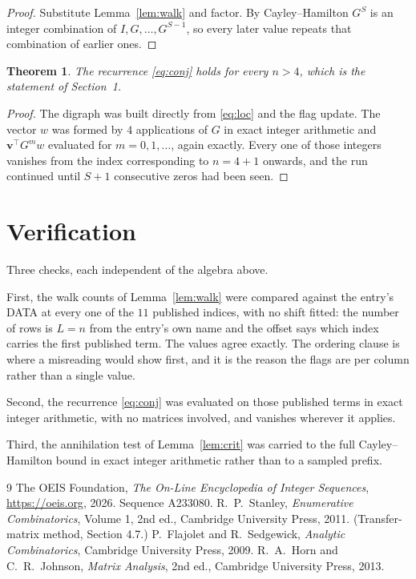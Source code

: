 \documentclass[11pt,a4paper]{article}
\theoremstyle{plain}
\newtheorem{theorem}{Theorem}
\theoremstyle{definition}
\begin{document}
\begin{proof}
Substitute Lemma~\ref{lem:walk} and factor. By Cayley--Hamilton $G^{S}$ is an integer
combination of $I,G,\dots,G^{S-1}$, so every later value repeats that combination of earlier
ones.
\end{proof}

\begin{theorem}
The recurrence \eqref{eq:conj} holds for every $n>4$, which is the statement of
Section~1.
\end{theorem}

\begin{proof}
The digraph was built directly from \eqref{eq:loc} and the flag update. The vector $w$ was
formed by $4$ applications of $G$ in exact integer arithmetic and
$\mathbf{v}^{\!\top}G^{m}w$ evaluated for $m=0,1,\dots$, again exactly. Every one of
those integers vanishes from the index corresponding to $n=4+1$ onwards, and the run
continued until $S+1$ consecutive zeros had been seen.
\end{proof}

\section{Verification}

Three checks, each independent of the algebra above.

First, the walk counts of Lemma~\ref{lem:walk} were compared against the entry's DATA at
every one of the $11$ published indices, with no shift fitted: the number of rows is
$L=n$ from the entry's own name and the offset says which index carries the first
published term. The values agree exactly. The ordering clause is where a misreading would
show first, and it is the reason the flags are per column rather than a single value.

Second, the recurrence \eqref{eq:conj} was evaluated on those published terms in exact
integer arithmetic, with no matrices involved, and vanishes wherever it applies.

Third, the annihilation test of Lemma~\ref{lem:crit} was carried to the full
Cayley--Hamilton bound in exact integer arithmetic rather than to a sampled prefix.

\begin{thebibliography}{9}
 The OEIS Foundation, \emph{The On-Line Encyclopedia of Integer
Sequences}, \url{https://oeis.org}, 2026. Sequence A233080.
 R.~P.~Stanley, \emph{Enumerative Combinatorics}, Volume 1, 2nd ed.,
Cambridge University Press, 2011. (Transfer-matrix method, Section 4.7.)
 P.~Flajolet and R.~Sedgewick, \emph{Analytic Combinatorics}, Cambridge
University Press, 2009.
 R.~A.~Horn and C.~R.~Johnson, \emph{Matrix Analysis}, 2nd ed., Cambridge
University Press, 2013.
\end{thebibliography}
\end{document}
